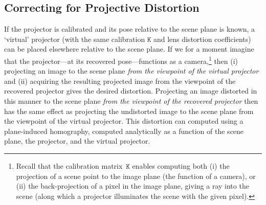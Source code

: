 \documentclass[review]{elsarticle}
\begin{document}
\subsection{Correcting for Projective Distortion}\label{sec:approach:homography}

If the projector is calibrated and its pose relative to the scene plane is known, a `virtual' projector (with the same calibration $\mathtt{K}$ and lens distortion coefficients) can be placed elsewhere relative to the scene plane. If we for a moment imagine that the projector---at its recovered pose---functions as a camera,\footnote{Recall that the calibration matrix~$\mathtt{K}$ enables computing both (i) the projection of a scene point to the image plane (the function of a camera), or (ii) the back-projection of a pixel in the image plane, giving a ray into the scene (along which a projector illuminates the scene with the given pixel).} then (i) projecting an image to the scene plane \textit{from the viewpoint of the virtual projector} and (ii) acquiring the resulting projected image from the viewpoint of the recovered projector gives the desired distortion. Projecting an image distorted in this manner to the scene plane \textit{from the viewpoint of the recovered projector} then has the same effect as projecting the undistorted image to the scene plane from the viewpoint of the virtual projector. This distortion can computed using a plane-induced homography, computed analytically as a function of the scene plane, the projector, and the virtual projector.
\end{document}
